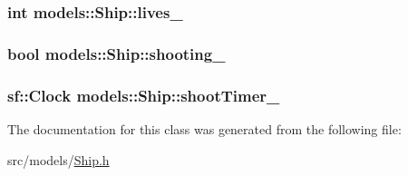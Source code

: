 \hypertarget{classmodels_1_1Ship_aeaaf9231898ee877f11000788806409a}{
\subsubsection[{lives\-\_\-}]{\setlength{\rightskip}{0pt plus 5cm}int {\bf models\-::\-Ship\-::lives\-\_\-}}}\label{d0/d37/classmodels_1_1Ship_aeaaf9231898ee877f11000788806409a}
\hypertarget{classmodels_1_1Ship_ac9326d94309c9c1a649076aba1c9fc4f}{
\subsubsection[{shooting\-\_\-}]{\setlength{\rightskip}{0pt plus 5cm}bool {\bf models\-::\-Ship\-::shooting\-\_\-}}}\label{d0/d37/classmodels_1_1Ship_ac9326d94309c9c1a649076aba1c9fc4f}
\hypertarget{classmodels_1_1Ship_a286ba7211706245e5b7a6315a26edf57}{
\subsubsection[{shoot\-Timer\-\_\-}]{\setlength{\rightskip}{0pt plus 5cm}sf\-::\-Clock {\bf models\-::\-Ship\-::shoot\-Timer\-\_\-}}}\label{d0/d37/classmodels_1_1Ship_a286ba7211706245e5b7a6315a26edf57}


\-The documentation for this class was generated from the following file\-:\begin{DoxyCompactItemize}
\item 
src/models/\hyperlink{Ship_8h}{\-Ship.\-h}\end{DoxyCompactItemize}
